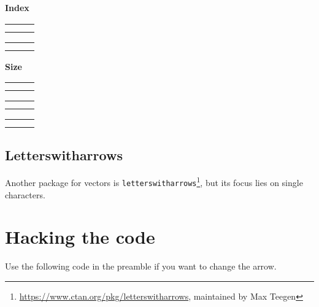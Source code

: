 \documentclass[12pt]{article}
\makeatletter
\newenvironment{comparision}{%
\setlength{\extrarowheight}{\medskipamount}%
\begin{tabular}{@{}l @{\hspace{1em}} @{}l @{\hspace{1em}} @{}l}%
}{%
\end{tabular}%
}
\makeatother
\begin{document}
\bigskip\textbf{Index}\bigskip

\begin{multicols}{2}
\begin{comparision}
\showcaseCmpA{$\vec{a_{ix}}$} \\
\showcaseCmpB{$\vv{a_{ix}}$}
\end{comparision}

\begin{comparision}
\showcaseCmpA{$\vec{a}[ix]$} \\
\showcaseCmpB{$\vv*{a}{ix}$}
\end{comparision}
\end{multicols}

\bigskip\textbf{Size}\bigskip

\begin{comparision}
\showcaseCmpA{$\vec{E}_{\vec{E}_{\vec{E}}}$} \\
\showcaseCmpB{$\vv{E}_{\vv{E}_{\vv{E}}}$}
\end{comparision}\bigskip

\begin{comparision}
\showcaseCmpA{$\vec{E}^{\vec{E}^{\vec{E}}}$} \\
\showcaseCmpB{$\vv{E}^{\vv{E}^{\vv{E}}}$}
\end{comparision}\bigskip

\begin{comparision}
\showcaseCmpA{\Huge$\vec{x}$} \\
\showcaseCmpB{\Huge$\vv{x}$}
\end{comparision}

\subsection{Letterswitharrows}

Another package for vectors is \verb|letterswitharrows|\footnote{\url{https://www.ctan.org/pkg/letterswitharrows}, maintained by Max Teegen}, but its focus lies on single characters.

\section{Hacking the code}

Use the following code in the preamble if you want to change the arrow.\bigskip
\end{document}
